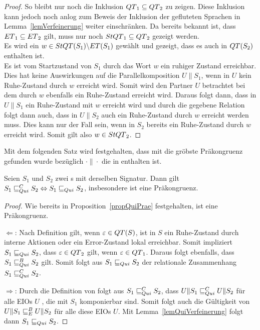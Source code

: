 \begin{proof}
  So bleibt nur noch die Inklusion $QT{}_1\subseteq QT{}_2$ zu
  zeigen. Diese Inklusion kann jedoch noch anlog zum Beweis der Inklusion
  der gefluteten Sprachen in Lemma~\ref{lemVerfeinerung} weiter einschränken.
  Da bereits bekannt ist, dass $ET{}_1\subseteq ET{}_2$ gilt, muss nur
  noch $StQT{}_1\subseteq QT{}_2$ gezeigt werden.\\
  Es wird ein $w\in StQT{}(S_1)\backslash ET{}(S_1)$ gewählt und gezeigt, dass
  es auch in $QT{}(S_2)$ enthalten ist.\\
  Es ist vom Startzustand von $S_1$ durch das Wort $w$ ein ruhiger Zustand
  erreichbar. Dies hat keine Auswirkungen auf die Parallelkomposition $U\|S_1$,
  wenn in $U$ kein Ruhe-Zustand durch $w$ erreicht wird. Somit wird
  den Partner $U$ betrachtet bei dem durch $w$ ebenfalls ein Ruhe-Zustand erreicht wird.
  Daraus folgt dann, dass in $U\|S_1$ ein Ruhe-Zustand mit $w$ erreicht wird
  und durch die gegebene Relation folgt dann auch, dass in $U\|S_2$ auch ein
  Ruhe-Zustand durch $w$ erreicht werden muss. Dies kann nur der Fall sein,
  wenn in $S_2$ bereits ein Ruhe-Zustand durch $w$ erreicht wird. Somit gilt
  also $w\in StQT{}_2$.%
\end{proof}

Mit dem folgenden Satz wird festgehalten, dass mit \QRel{} die gröbste
Präkongruenz gefunden wurde bezüglich $\cdot\|\cdot$ die in \QBRel{} enthalten
ist.

\begin{satz}
  \label{satzQuiFullAbst}
  Seien $S_1$ und $S_2$ zwei \EIO{}s mit derselben Signatur. Dann gilt
  $S_1\sqsubseteq _{Qui}^C S_2\Leftrightarrow S_1\sqsubseteq _{Qui} S_2$, insbesondere ist \QRel{} eine
  Präkongruenz.
\end{satz}

\begin{proof}
  Wie bereits in Proposition~\ref{propQuiPrae} festgehalten, ist \QRel{} eine
  Präkongruenz.

  \glqq{}$\Leftarrow$\grqq{}: Nach Definition gilt, wenn
  $\varepsilon\in QT{}(S)$, ist in $S$ ein Ruhe-Zustand durch interne Aktionen
  oder ein Error-Zustand lokal erreichbar. Somit impliziert $S_1\sqsubseteq _{Qui} S_2$,
  dass $\varepsilon\in QT{}_2$ gilt, wenn $\varepsilon\in QT{}_1$. Daraus folgt
  ebenfalls, dass $S_1\sqsubseteq _{Qui}^B S_2$ gilt. Somit folgt aus $S_1\sqsubseteq _{Qui} S_2$ der
  relationale Zusammenhang $S_1\sqsubseteq _{Qui}^C S_2$.

  \glqq{}$\Rightarrow$\grqq{}: Durch die Definition von \QCRel{} folgt aus
  $S_1\sqsubseteq _{Qui}^C{} S_2$, dass $U\|S_1\sqsubseteq _{Qui}^C U\|S_2$ für alle EIOs $U$ , die mit
  $S_1$ komponierbar sind. Somit folgt auch die Gültigkeit von $U\|S_1\sqsubseteq _E^B
  U\|S_2$ für alle diese EIOs $U$. Mit Lemma~\ref{lemQuiVerfeinerung} folgt
  dann $S_1\sqsubseteq _{Qui}{} S_2$.
\end{proof}

